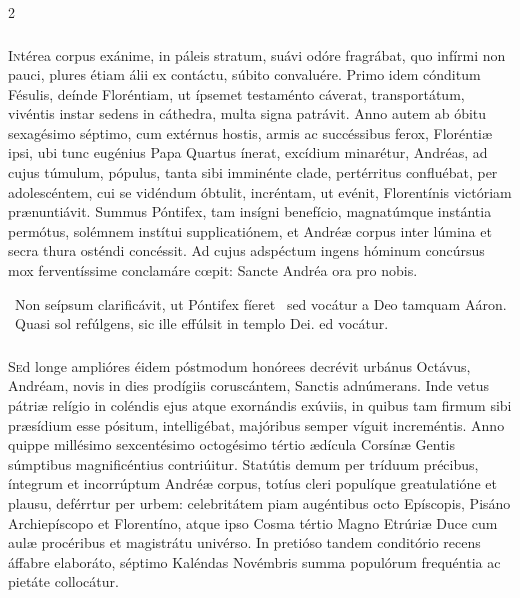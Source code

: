 \documentclass[9pt,twoside]{extarticle}
\begin{document}
\begin{multicols}{2}
\subsubsection*{\center {}}
\lettrine{I}ntérea corpus exánime, in páleis stratum, suávi odóre fragrábat, quo infírmi non pauci, plures étiam álii ex contáctu, súbito convaluére. Primo idem cónditum Fésulis, deínde Floréntiam, ut ípsemet testaménto cáverat, transportátum, vivéntis instar sedens in cáthedra, multa signa patrávit. Anno autem ab óbitu sexagésimo séptimo, cum extérnus hostis, armis ac succéssibus ferox, Floréntiæ ipsi, ubi tunc eugénius Papa Quartus ínerat, excídium minarétur, Andréas, ad cujus túmulum, pópulus, tanta sibi imminénte clade, pertérritus confluébat, per adolescéntem, cui se vidéndum óbtulit, incréntam, ut evénit, Florentínis victóriam prænuntiávit. Summus Póntifex, tam insígni benefício, magnatúmque instántia permótus, solémnem instítui supplicatiónem, et Andréæ corpus inter lúmina et secra thura osténdi concéssit. Ad cujus adspéctum ingens hóminum concúrsus mox ferventíssime conclamáre cœpit: Sancte Andréa ora pro nobis.

\begin{tightlist}{}
\item {}~Non seípsum clarificávit, ut Póntifex fíeret \textred{*}~sed vocátur a Deo tamquam Aáron. ~Quasi sol refúlgens, sic ille effúlsit in templo Dei. ed vocátur.
\end{tightlist}

\subsubsection*{\center {}}
\lettrine{S}ed longe amplióres éidem póstmodum honórees decrévit urbánus Octávus, Andréam, novis in dies prodígiis coruscántem, Sanctis adnúmerans. Inde vetus pátriæ relígio in coléndis ejus atque exornándis exúviis, in quibus tam firmum sibi præsídium esse pósitum, intelligébat, majóribus semper víguit increméntis. Anno quippe millésimo sexcentésimo octogésimo tértio ædícula Corsínæ Gentis súmptibus magnificéntius contriúitur. Statútis demum per tríduum précibus, íntegrum et incorrúptum Andréæ corpus, totíus cleri populíque greatulatióne et plausu, deférrtur per urbem: celebritátem piam augéntibus octo Epíscopis, Pisáno Archiepíscopo et Florentíno, atque ipso Cosma tértio Magno Etrúriæ Duce cum aulæ procéribus et magistrátu univérso. In pretióso tandem conditório recens áffabre elaboráto, séptimo Kaléndas Novémbris summa populórum frequéntia ac pietáte collocátur.


\end{multicols}
\end{document}

